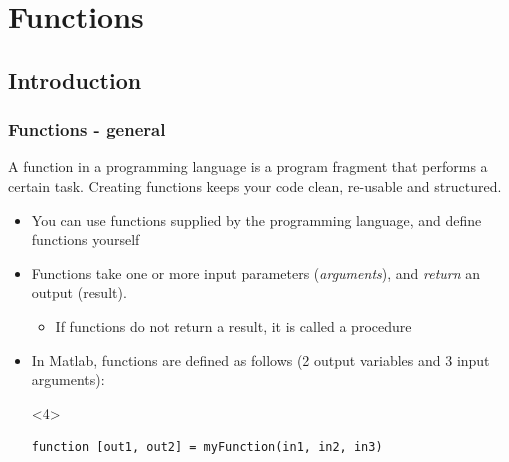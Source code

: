 \documentclass[11pt,table,final,fleqn,xcolor={usenames,dvipsnames},unknownkeysallowed,handout]{beamer}
\begin{document}
\section{Functions}
\subsection*{Introduction}
\begin{frame}[fragile]
 \frametitle{Functions - general}
 A function in a programming language is a program fragment that performs a certain task. Creating functions keeps your code clean, re-usable and structured.
 \begin{itemize}
    \item You can use functions supplied by the programming language, and define functions yourself
    \item Functions take one or more input parameters (\emph{arguments}), and \emph{return} an output (result).
   \begin{itemize}
      \item If functions do not return a result, it is called a procedure
   \end{itemize}
    \item In Matlab, functions are defined as follows (2 output variables and 3 input arguments):
  \begin{overlayarea}{\textwidth}{2em}
   \begin{onlyenv}<4>
    \begin{lstlisting}
function [out1, out2] = myFunction(in1, in2, in3)
    \end{lstlisting}
    \end{onlyenv}
   \end{overlayarea}
  \end{itemize}
\end{frame}
\end{document}
